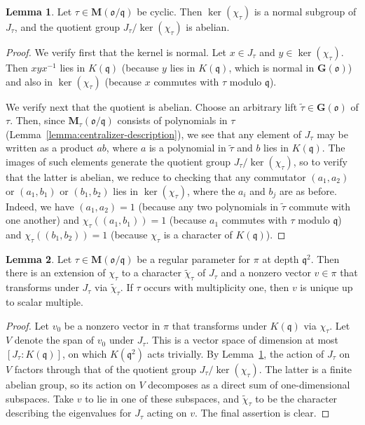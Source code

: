 \documentclass[reqno]{amsart}
\theoremstyle{plain} \newtheorem{theorem} {Theorem} \newtheorem{conjecture} {Conjecture} \newtheorem{corollary} [theorem] {Corollary} \newtheorem{proposition} [theorem] {Proposition} \newtheorem{fact} [theorem] {Fact}
\theoremstyle{definition} \newtheorem{definition} [theorem] {Definition}
\theoremstyle{itplain} %
\newtheorem{lemma}[theorem]{Lemma}
\newcommand{\mfq}{\mathfrak{q}}
\begin{document}
\begin{lemma}\label{lemma:cj3m0fjios}
  Let $\tau \in \mathbf{M}(\mathfrak{o}/\mathfrak{q})$ be cyclic.  Then $\ker(\chi_\tau)$ is a normal subgroup of $J_\tau$, and the quotient group $J_\tau / \ker(\chi_\tau)$ is abelian.
\end{lemma}
\begin{proof}
  We verify first that the kernel is normal.  Let $x \in J_\tau$ and $y \in \ker(\chi_\tau)$.  Then $x y x^{-1}$ lies in $K(\mathfrak{q})$ (because $y$ lies in $K(\mathfrak{q})$, which is normal in $\mathbf{G}(\mathfrak{o})$) and also in $\ker(\chi_\tau)$ (because $x$ commutes with $\tau$ modulo $\mathfrak{q}$).

  We verify next that the quotient is abelian.  Choose an arbitrary lift $\tilde{\tau} \in \mathbf{G}(\mathfrak{o})$ of $\tau$.  Then, since $\mathbf{M}_\tau(\mathfrak{o}/\mathfrak{q})$ consists of polynomials in $\tau$ (Lemma~\ref{lemma:centralizer-description}), we see that any element of $J_\tau$ may be written as a product $a b$, where $a$ is a polynomial in $\tilde{\tau}$ and $b$ lies in $K(\mathfrak{q})$.  The images of such elements generate the quotient group $J_\tau / \ker(\chi_\tau)$, so to verify that the latter is abelian, we reduce to checking that any commutator $(a_1,a_2)$ or $(a_1,b_1)$ or $(b_1,b_2)$ lies in $\ker(\chi_\tau)$, where the $a_i$ and $b_j$ are as before.  Indeed, we have $(a_1,a_2) = 1$ (because any two polynomials in $\tilde{\tau}$ commute with one another) and $\chi_\tau((a_1,b_1)) = 1$ (because $a_1$ commutes with $\tau$ modulo $\mathfrak{q}$) and $\chi_\tau((b_1,b_2)) = 1$ (because $\chi_\tau$ is a character of $K(\mathfrak{q})$).
\end{proof}

\begin{lemma}\label{lemma:let-tau-in-mathbfm-mathfr--mathfr-be-regul-param-p-extension-chi-tau-to-J-tau}
  Let $\tau \in \mathbf{M} (\mathfrak{o} / \mfq)$ be a regular parameter for $\pi$ at depth $\mfq^2$.  Then there is an extension of $\chi_\tau$ to a character $\tilde{\chi}_\tau$ of $J_\tau$ and a nonzero vector $v \in \pi$ that transforms under $J_\tau $ via $\tilde{\chi }_\tau $.  If $\tau$ occurs with multiplicity one, then $v$ is unique up to scalar multiple.
\end{lemma}
\begin{proof}
  Let $v_0$ be a nonzero vector in $\pi$ that transforms under $K(\mfq)$ via $\chi_\tau$.  Let $V$ denote the span of $v_0$ under $J_\tau$.  This is a vector space of dimension at most $[J_\tau:K(\mfq)]$, on which $K(\mfq^2)$ acts trivially.  By Lemma~\ref{lemma:cj3m0fjios}, the action of $J_\tau$ on $V$ factors through that of the quotient group $J_\tau / \ker(\chi_\tau)$.  The latter is a finite abelian group, so its action on $V$ decomposes as a direct sum of one-dimensional subspaces.  Take $v$ to lie in one of these subspaces, and $\tilde{\chi}_\tau$ to be the character describing the eigenvalues for $J_\tau$ acting on $v$.  The final assertion is clear.
\end{proof}
\end{document}
